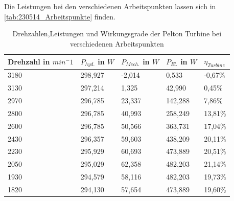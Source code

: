Die Leistungen bei den verschiedenen Arbeitspunkten lassen sich in \autoref{tab:230514_Arbeitspunkte} finden.
\begin{table}[H]
  \caption{Drehzahlen,Leistungen und Wirkungsgrade der Pelton Turbine bei verschiedenen Arbeitspunkten}
  \centering
  \begin{tabular}{|l|l|l|l|l|}
      \hline
      \rowcolor[HTML]{70AD47} 
      Drehzahl in $min^-1$ & $P_{hyd.}$ in $W$ & $P_{Mech.}$ in $W$ & $P_{El.}$ in $W$ & \cellcolor[HTML]{5B9BD5}$\eta_{Turbine}$ \\ \hline \hline
      \rowcolor[HTML]{E2EFDA} 
      \rowcolor[HTML]{E2EFDA} 
      3180                                & 298,927      & -2,014        & 0,533       & \cellcolor[HTML]{DDEBF7}-0,67\%      \\ \hline
      \rowcolor[HTML]{A9D08E} 
      3130                                & 297,214      & 1,325         & 42,990      & \cellcolor[HTML]{BDD7EE}0,45\%       \\ \hline
      \rowcolor[HTML]{E2EFDA} 
      2970                                & 296,785      & 23,337        & 142,288     & \cellcolor[HTML]{DDEBF7}7,86\%       \\ \hline
      \rowcolor[HTML]{A9D08E} 
      2800                                & 296,785      & 40,993        & 258,249     & \cellcolor[HTML]{BDD7EE}13,81\%      \\ \hline
      \rowcolor[HTML]{E2EFDA} 
      2600                                & 296,785      & 50,566        & 363,731     & \cellcolor[HTML]{DDEBF7}17,04\%      \\ \hline
      \rowcolor[HTML]{A9D08E} 
      2430                                & 296,357      & 59,603        & 438,209     & \cellcolor[HTML]{BDD7EE}20,11\%      \\ \hline
      \rowcolor[HTML]{E2EFDA} 
      2230                                & 295,929      & 60,693        & 473,889     & \cellcolor[HTML]{DDEBF7}20,51\%      \\ \hline
      \rowcolor[HTML]{A9D08E} 
      2050                                & 295,029      & 62,358        & 482,203     & \cellcolor[HTML]{BDD7EE}21,14\%      \\ \hline
      \rowcolor[HTML]{E2EFDA} 
      1930                                & 294,579      & 58,116        & 482,203     & \cellcolor[HTML]{DDEBF7}19,73\%      \\ \hline
      \rowcolor[HTML]{A9D08E} 
      1820                                & 294,130      & 57,654        & 473,889     & \cellcolor[HTML]{BDD7EE}19,60\%      \\ \hline

\end{tabular}
\end{table}
